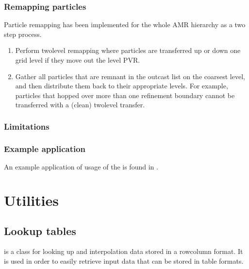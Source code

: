 \documentclass[letterpaper,10pt,english]{sphinxmanual}
\begin{document}
\subsection{Remapping particles}
\label{\detokenize{Solvers/Ito:remapping-particles}}
Particle remapping has been implemented for the whole AMR hierarchy as a two step process.
\begin{enumerate}
%
\item {} 
Perform two\sphinxhyphen{}level remapping where particles are transferred up or down one grid level if they move out the level PVR.

\item {} 
Gather all particles that are remnant in the outcast list on the coarsest level, and then distribute them back to their appropriate levels. For example, particles that hopped over more than one refinement boundary cannot be transferred with a (clean) two\sphinxhyphen{}level transfer.

\end{enumerate}


\subsection{Limitations}
\label{\detokenize{Solvers/Ito:limitations}}

\subsection{Example application}
\label{\detokenize{Solvers/Ito:example-application}}
An example application of usage of the  is found in {\hyperref[\detokenize{Applications/BrownianWalkerModel:chap-brownianwalkermodel}]{}}.


\chapter{Utilities}
\label{\detokenize{index:utilities}}

\section{Lookup tables}
\label{\detokenize{Utilities/LookupTable:lookup-tables}}\label{\detokenize{Utilities/LookupTable:chap-lookuptable}}\label{\detokenize{Utilities/LookupTable::doc}}
 is a class for looking up and interpolation data stored in a row\sphinxhyphen{}column format.
It is used in order to easily retrieve input data that can be stored in table formats.
\end{document}
